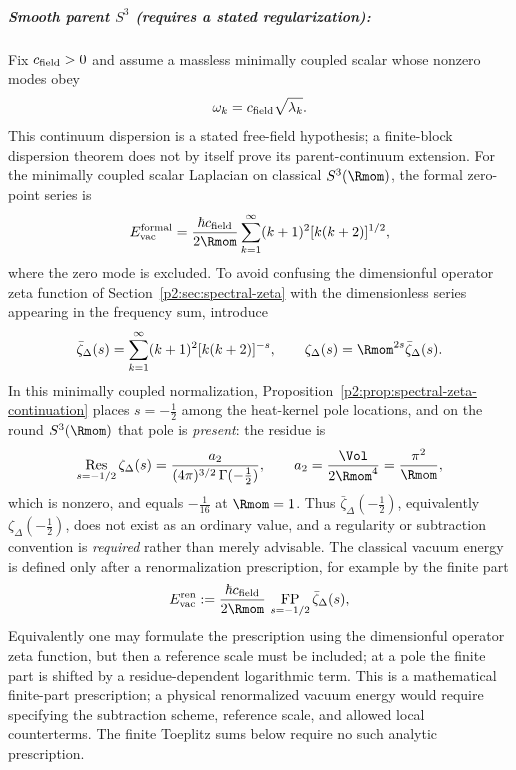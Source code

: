 \documentclass[11pt,a4paper]{article}
\begin{document}
\subparagraph{\texorpdfstring{Smooth parent $S^3$ (requires a stated regularization):}{Smooth parent S3 (requires a stated regularization):}}
\begin{proposition}
\label{p2:prop:casimir-classical}
Fix \(c_{\rm field}>0\) and assume a massless minimally coupled scalar whose
nonzero modes obey
\[
        \omega_k=c_{\rm field}\sqrt{\lambda_k}.
\]
This continuum dispersion is a stated free-field hypothesis; a finite-block
dispersion theorem does not by itself prove its parent-continuum extension.  For the
minimally coupled scalar Laplacian on classical \(S^3(\Rmom)\), the formal
zero-point series is \cite{Dowker1976,Camporesi1991}
\begin{equation}
E_{\mathrm{vac}}^{\mathrm{formal}}
=
\frac{\hbar c_{\rm field}}{2\Rmom}
\sum_{k=1}^\infty (k+1)^2[k(k+2)]^{1/2},
\end{equation}
where the zero mode is excluded.  To avoid confusing the dimensionful operator zeta function of Section~\ref{p2:sec:spectral-zeta} with the dimensionless series appearing in the frequency sum, introduce
\[
\bar\zeta_\Delta(s)=\sum_{k=1}^\infty (k+1)^2 [k(k+2)]^{-s},
\qquad
\zeta_\Delta(s)=\Rmom^{2s}\bar\zeta_\Delta(s).
\]
In this minimally coupled normalization, Proposition~\ref{p2:prop:spectral-zeta-continuation} places \(s=-\tfrac12\) among the heat-kernel pole locations, and on the round \(S^3(\Rmom)\) that pole is \emph{present}: the residue is
\[
  \operatorname*{Res}_{s=-1/2}\zeta_\Delta(s)
  =\frac{a_2}{(4\pi)^{3/2}\,\Gamma(-\tfrac12)},
  \qquad
  a_2=\frac{\Vol}{2\Rmom^{4}}=\frac{\pi^{2}}{\Rmom},
\]
which is nonzero, and equals \(-\tfrac1{16}\) at \(\Rmom=1\).  Thus
\(\bar\zeta_\Delta(-\tfrac12)\), equivalently \(\zeta_\Delta(-\tfrac12)\), does not exist as an ordinary value, and a regularity or subtraction convention is \emph{required} rather than merely advisable.  The classical vacuum energy is defined only after a renormalization prescription, for example by the finite part
\begin{equation}
E_{\mathrm{vac}}^{\mathrm{ren}}
:=
\frac{\hbar c_{\rm field}}{2\Rmom}\,
\operatorname*{FP}_{s=-1/2}\bar\zeta_\Delta(s),
\end{equation}
Equivalently one may formulate the prescription using the dimensionful operator zeta function, but then a reference scale must be included; at a pole the finite part is shifted by a residue-dependent logarithmic term.  This is a mathematical finite-part prescription; a physical renormalized vacuum energy would require specifying the subtraction scheme, reference scale, and allowed local counterterms.  The finite Toeplitz sums below require no such analytic prescription.
\end{proposition}
\end{document}
